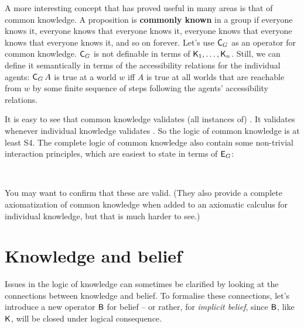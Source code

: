A more interesting concept that has proved useful in many areas is that of
common knowledge. A proposition is \textbf{commonly known} in a group if
everyone knows it, everyone knows that everyone knows it, everyone knows that
everyone knows that everyone knows it, and so on forever. Let's use $\operatorname{\mathsf{C}}_{G}$
as an operator for common knowledge. $\operatorname{\mathsf{C}}_G$ is not definable in terms of
$\operatorname{\mathsf{K}{}}_1, \ldots,\operatorname{\mathsf{K}{}}_n$. Still, we can define it semantically in terms of the
accessibility relations for the individual agents: $\operatorname{\mathsf{C}}_{G} A$ is true at a
world $w$ iff $A$ is true at all worlds that are reachable from $w$ by some
finite sequence of steps following the agents' accessibility relations.


It is easy to see that common knowledge validates (all instances of) . It
validates  whenever individual knowledge validates . So the logic of
common knowledge is at least S4. The complete logic of common knowledge also
contain some non-trivial interaction principles, which are easiest to state in
terms of $\operatorname{\mathsf{E}}_G$:
%
\begin{principles}
  \\
\end{principles}
%
You may want to confirm that these are valid. (They also provide a complete
axiomatization of common knowledge when added to an axiomatic calculus for
individual knowledge, but that is much harder to see.)


\fi

\section{Knowledge and belief}
\label{sec:kb}

Issues in the logic of knowledge can sometimes be clarified by looking at the
connections between knowledge and belief. To formalise these connections, let's
introduce a new operator $\operatorname{\mathsf{B}}$ for belief -- or rather, for \emph{implicit
  belief}, since $\operatorname{\mathsf{B}}$, like $\operatorname{\mathsf{K}{}}$, will be closed under logical
consequence.

